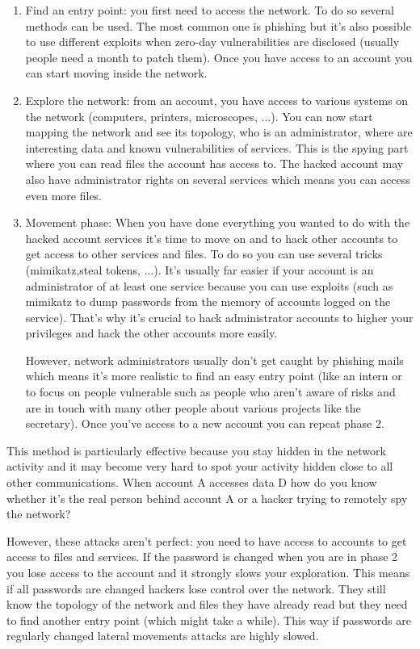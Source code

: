 \documentclass[11pt]{article}
\begin{document}
\begin{enumerate}
\item Find an entry point: you first need to access the network. To do so several methods can be used. The most common one is phishing but it's also possible to use different exploits when zero-day vulnerabilities are disclosed (usually people need a month to patch them). Once you have access to an account you can start moving inside the network.
\item Explore the network: from an account, you have access to various systems on the network (computers, printers, microscopes, ...). You can now start mapping the network and see its topology, who is an administrator, where are interesting data and known vulnerabilities of services. This is the spying part where you can read files the account has access to. The hacked account may also have administrator rights on several services which means you can access even more files.\\
\item Movement phase: When you have done everything you wanted to do with the hacked account services it's time to move on and to hack other accounts to get access to other services and files. To do so you can use several tricks (mimikatz,steal tokens, ...). It's usually far easier if your account is an administrator of at least one service because you can use exploits (such as mimikatz to dump passwords from the memory of accounts logged on the service). That's why it's crucial to hack administrator accounts to higher your privileges and hack the other accounts more easily.

However, network administrators usually don't get caught by phishing mails which means it's more realistic to find an easy entry point (like an intern or to focus on people vulnerable such as people who aren't aware of risks and are in touch with many other people about various projects like the secretary). Once you've access to a new account you can repeat phase 2.
\end{enumerate}
This method is particularly effective because you stay hidden in the network activity and it may become very hard to spot your activity hidden close to all other communications. When account A accesses data D how do you know whether it's the real person behind account A or a hacker trying to remotely spy the network?

However, these attacks aren't perfect: you need to have access to accounts to get access to files and services. If the password is changed when you are in phase 2 you lose access to the account and it strongly slows your exploration. This means if all passwords are changed hackers lose control over the network. They still know the topology of the network and files they have already read but they need to find another entry point (which might take a while). This way if passwords are regularly changed lateral movements attacks are highly slowed.
\end{document}
